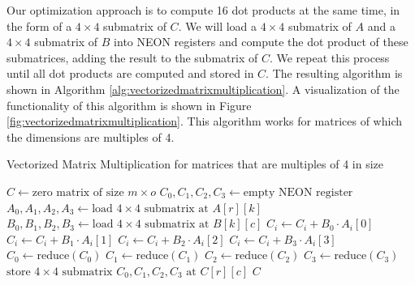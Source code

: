 \documentclass[11pt,a4paper]{report}
\theoremstyle{definition}
\begin{document}
Our optimization approach is to compute 16 dot products at the same time, in the form of a $4\times4$ submatrix of $C$. We will load a $4\times4$ submatrix of $A$ and a $4\times4$ submatrix of $B$ into NEON registers and compute the dot product of these submatrices, adding the result to the submatrix of $C$. We repeat this process until all dot products are computed and stored in $C$. The resulting algorithm is shown in Algorithm \ref{alg:vectorizedmatrixmultiplication}. A visualization of the functionality of this algorithm is shown in Figure \ref{fig:vectorizedmatrixmultiplication}. This algorithm works for matrices of which the dimensions are multiples of 4.

\begin{algorithm}
  \caption{Vectorized Matrix Multiplication for matrices that are multiples of 4 in size}
  \label{alg:vectorizedmatrixmultiplication}
  \begin{algorithmic}
      \State $C \gets \text{zero matrix of size } m \times o$
          \State $C_0, C_1, C_2, C_3 \gets \text{empty NEON register}$
            \State $A_0, A_1, A_2, A_3 \gets \text{load } 4\times4 \text{ submatrix at } A[r][k]$
            \State $B_0, B_1, B_2, B_3 \gets \text{load } 4\times4 \text{ submatrix at } B[k][c]$
              \State $C_i \gets C_i + B_0 \cdot A_i[0]$
              \State $C_i \gets C_i + B_1 \cdot A_i[1]$
              \State $C_i \gets C_i + B_2 \cdot A_i[2]$
              \State $C_i \gets C_i + B_3 \cdot A_i[3]$
            \EndFor
          \EndFor
          \State $C_0 \gets \text{reduce}(C_0)$
          \State $C_1 \gets \text{reduce}(C_1)$
          \State $C_2 \gets \text{reduce}(C_2)$
          \State $C_3 \gets \text{reduce}(C_3)$
          \State $\text{store } 4\times4 \text{ submatrix } C_0, C_1, C_2, C_3 \text{ at } C[r][c]$
        \EndFor
      \EndFor
      \State \Return $C$
    \EndFunction
  \end{algorithmic}
\end{algorithm}
\end{document}
